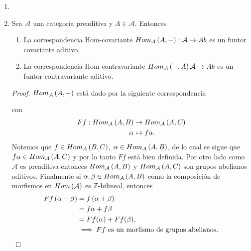 \documentclass{article}
\begin{document}
\begin{enumerate}[label=\textbf{Ej \arabic*.}]
\begin{proof}
			Suponga, así, que $\psi = \psi_{1}\coprod\psi_{2}$. Luego, $\psi_{i} \in Hom\lrprth{\varphi_{i},\varphi_{i}}$, con $i=1,2$. Por la minimalidad a derecha de cada $\varphi_{1}$, se satisface que $\psi_{1}$ y $\psi_{2}$ son isomorfismos. Por lo que $\psi$ es un isomorfismo.\\
			$\therefore\varphi_{1}\coprod\varphi_{2}$ es minimal a derecha.
		\end{proof}
	
		\item
		\item Sea $\mathcal{A}$ una categoría preaditiva y $A\in\mathcal{A}$. Entonces
		\begin{enumerate}
			\item La correspondencia Hom-covariante $Hom_\mathcal{A}\left(A,-\right):\mathcal{A}\to Ab$ es un funtor covariante aditivo.
			\item La correspondencia Hom-contravariante $Hom_\mathcal{A}\left(-,A\right)\mathcal{A}\to Ab$ es un funtor contravariante aditivo.
		\end{enumerate}
		\begin{proof}
			 $Hom_\mathcal{A}\left(A,-\right)$ está dado por la siguiente correspondencia
				\begin{center}
				\end{center}
			con 
			\begin{align*}
				Ff: Hom_{\mathcal{A}}\left(A,B\right) &\rightarrow Hom_{\mathcal{A}}\left(A,C\right)\\ \alpha &\mapsto f\alpha.
			\end{align*}
			Notemos que $f\in Hom_{\mathcal{A}}\left(B,C\right)$, $\alpha\in Hom_{\mathcal{A}}\left(A,B\right)$, de lo cual se sigue que $f\alpha\in Hom_{\mathcal{A}}\left(A,C\right)$ y por lo tanto $Ff$ está bien definida. Por otro lado como $\mathcal{A}$ es preaditiva entonces $Hom_{\mathcal{A}}\left(A,B\right)$ y $Hom_{\mathcal{A}}\left(A,C\right)$ son grupos abelianos aditivos. Finalmente si $\alpha,\beta\in Hom_{\mathcal{A}}\left(A,B\right)$ como la composición de morfismos en $Hom\left(\mathcal{A}\right)$ es $\mathbb{Z}$-bilineal, entonces
			\begin{align*}
				Ff\lrprth{\alpha+\beta}&=f\lrprth{\alpha+\beta}\\
				&=f\alpha+f\beta\\
				&=Ff(\alpha)+Ff(\beta),\\
				&\implies Ff\text{ es un morfismo de grupos abelianos}.

\end{align*}
\end{proof}
\end{enumerate}
\end{document}
